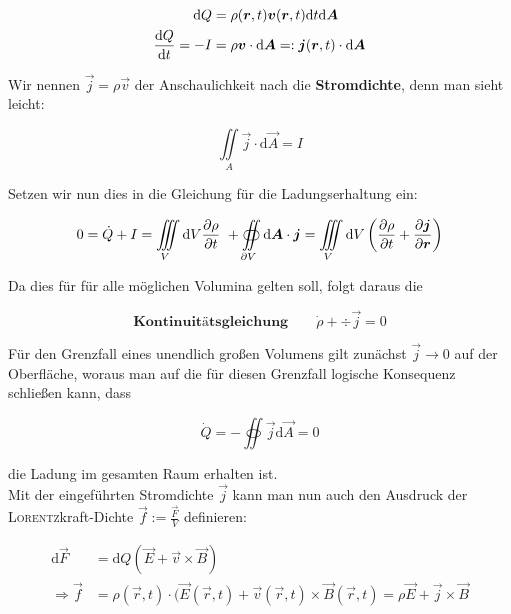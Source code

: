 \begin{align*}
\mathrm{d}Q &= \rho(\bm{r},t)\bm{v}(\bm{r},t)\mathrm{d}t\mathrm{d}\bm{A}\\
\frac{\mathrm{d}{Q}}{\mathrm{d}{t}} =-I &= \rho\bm{v}\cdot\mathrm{d}\bm{A}=:\bm{j}(\bm{r},t)\cdot\mathrm{d}\bm{A}
\end{align*}

Wir nennen $\vec{j} = \rho\vec{v}$ der Anschaulichkeit nach die \textbf{Stromdichte}, denn man sieht leicht:

\begin{equation*}
\iint\limits_A\vec{j}\cdot\mathrm{d}\vec{A}=I
\end{equation*}

Setzen wir nun dies in die Gleichung für die Ladungserhaltung ein:

\begin{equation*}
0 = \dot{Q} + I = \iiint\limits_V\mathrm{d}V\frac{\partial{\rho}}{\partial{t}} \ + \oiint\limits_{\partial V}\mathrm{d}\bm{A}\cdot\bm{j} = \iiint\limits_V \mathrm{d}V\left(\frac{\partial{\rho}}{\partial{t}} + \frac{\partial{\bm{j}}}{\partial{\bm{r}}}\right) 
\end{equation*}

Da dies für für alle möglichen Volumina gelten soll, folgt daraus die

\begin{equation*}
\textbf{Kontinuitätsgleichung}\qquad\dot{\rho} + \div\vec{j} = 0
\end{equation*} 

Für den Grenzfall eines unendlich großen Volumens gilt zunächst $\vec{j}\rightarrow 0$ auf der Oberfläche, woraus man auf die für diesen Grenzfall logische Konsequenz schließen kann, dass

\begin{equation*}
\dot{Q} = -\oiint\vec{j}\mathrm{d}\vec{A} = 0
\end{equation*}

die Ladung im gesamten Raum erhalten ist.\ \\


Mit der eingeführten Stromdichte $\vec{j}$ kann man nun auch den Ausdruck der \textsc{Lorentz}kraft-Dichte $\vec{f} := \frac{\vec{F}}{V}$ definieren:

\begin{align*}
\mathrm{d}\vec{F} & = \mathrm{d}Q(\vec{E} + \vec{v}\times\vec{B}) \\
\Rightarrow \vec{f} & = \rho(\vec{r},t)\cdot(\vec{E}(\vec{r},t) + \vec{v}(\vec{r},t)\times\vec{B}(\vec{r},t) = \rho\vec{E}+ \vec{j}\times\vec{B}
\end{align*}

